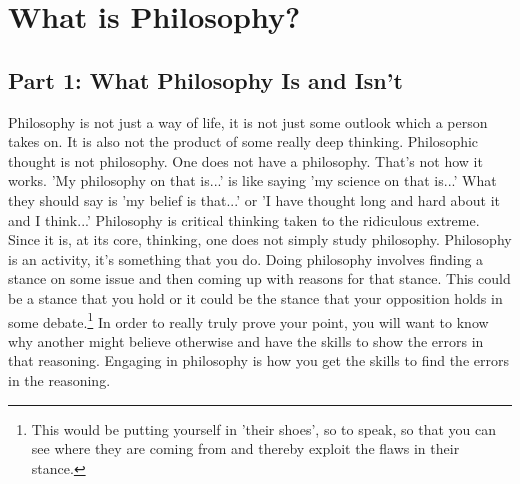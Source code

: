 \part{What is Philosophy?}
\label{ch.modone}
\chapter{Part 1: What Philosophy Is and Isn't}
Philosophy is not just a way of life, it is not just some outlook which a person takes on. It is also not the product of some really deep thinking. Philosophic thought is not philosophy. One does not have a philosophy. That's not how it works. 'My philosophy on that is...' is like saying 'my science on that is...' What they should say is 'my belief is that...' or 'I have thought long and hard about it and I think...' Philosophy is critical thinking taken to the ridiculous extreme. Since it is, at its core, thinking, one does not simply study philosophy. Philosophy is an activity, it's something that you do. Doing philosophy involves finding a stance on some issue and then coming up with reasons for that stance. This could be a stance that you hold or it could be the stance that your opposition holds in some debate.\footnote{This would be putting yourself in 'their shoes', so to speak, so that you can see where they are coming from and thereby exploit the flaws in their stance.} In order to really truly prove your point, you will want to know why another might believe otherwise and have the skills to show the errors in that reasoning. Engaging in philosophy is how you get the skills to find the errors in the reasoning. 

